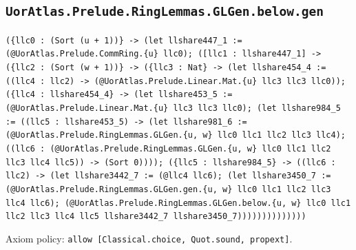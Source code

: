 \documentclass[11pt]{article}
\begin{document}
\subsection*{\texttt{UorAtlas.Prelude.RingLemmas.GLGen.below.gen}}
\noindent\texttt{(\{llc0 : (Sort (u + 1))\} -> (let llshare447\_1 := (@UorAtlas.Prelude.CommRing.\{u\} llc0); ([llc1 : llshare447\_1] -> (\{llc2 : (Sort (w + 1))\} -> (\{llc3 : Nat\} -> (let llshare454\_4 := ((llc4 : llc2) -> (@UorAtlas.Prelude.Linear.Mat.\{u\} llc3 llc3 llc0)); (\{llc4 : llshare454\_4\} -> (let llshare453\_5 := (@UorAtlas.Prelude.Linear.Mat.\{u\} llc3 llc3 llc0); (let llshare984\_5 := ((llc5 : llshare453\_5) -> (let llshare981\_6 := (@UorAtlas.Prelude.RingLemmas.GLGen.\{u, w\} llc0 llc1 llc2 llc3 llc4); ((llc6 : (@UorAtlas.Prelude.RingLemmas.GLGen.\{u, w\} llc0 llc1 llc2 llc3 llc4 llc5)) -> (Sort 0)))); (\{llc5 : llshare984\_5\} -> ((llc6 : llc2) -> (let llshare3442\_7 := (@llc4 llc6); (let llshare3450\_7 := (@UorAtlas.Prelude.RingLemmas.GLGen.gen.\{u, w\} llc0 llc1 llc2 llc3 llc4 llc6); (@UorAtlas.Prelude.RingLemmas.GLGen.below.\{u, w\} llc0 llc1 llc2 llc3 llc4 llc5 llshare3442\_7 llshare3450\_7))))))))))))))}\par
\noindent Axiom policy: \texttt{allow [Classical.choice, Quot.sound, propext]}.\par
\end{document}
